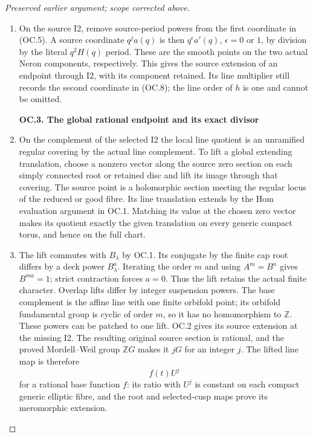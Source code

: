 \begin{proof}[Preserved earlier argument; scope corrected above]
\begin{enumerate}[label=\arabic*.]
\item On the source I2, remove source-period powers from the first
coordinate in (OC.5). A source coordinate \(q^j a(q)\) is
then \(q^\epsilon a'(q)\), \(\epsilon=0\) or \(1\),
by division by the literal \(q^2H(q)\) period. These are the
smooth points on the two actual Neron components, respectively.
This gives the source extension of an endpoint through I2, with
its component retained. Its line multiplier still records the
second coordinate in (OC.8); the line order of \(h\) is one
and cannot be omitted.

\par

\medskip\noindent\textbf{OC.3. The global rational endpoint and its exact divisor}

\par\nobreak

\item On the complement of the selected I2 the local line quotient is an
unramified regular covering by the actual line complement. To lift
a global extending translation, choose a nonzero vector along the
source zero section on each simply connected root or retained disc
and lift its image through that covering. The source point is a
holomorphic section meeting the regular locus of the reduced or
good fibre. Its line translation extends by the Hom evaluation
argument in OC.1. Matching its value at the chosen zero vector
makes its quotient exactly the given translation on every generic
compact torus, and hence on the full chart.

\item The lift commutes with \(B_\lambda\) by OC.1. Its conjugate
by the finite cap root differs by a deck power \(B_\lambda^a\).
Iterating the order \(m\) and using \(A^m=B^n\) gives
\(B^{ma}=1\); strict contraction forces \(a=0\). Thus the
lift retains the actual finite character. Overlap lifts differ by
integer suspension powers. The base complement is the affine line
with one finite orbifold point; its orbifold fundamental group is
cyclic of order \(m\), so it has no homomorphism to \(\mathbb Z\).
These powers can be patched to one lift. OC.2 gives its source
extension at the missing I2. The resulting original source section
is rational, and the proved Mordell--Weil group \(\mathbb ZG\)
makes it \(jG\) for an integer \(j\). The lifted line map is
therefore
\[
                            f(t)U^j                       \tag{OC.9}
\]
for a rational base function \(f\): its ratio with \(U^j\)
is constant on each compact generic elliptic fibre, and the root
and selected-cusp maps prove its meromorphic extension.


\end{enumerate}
\end{proof}
